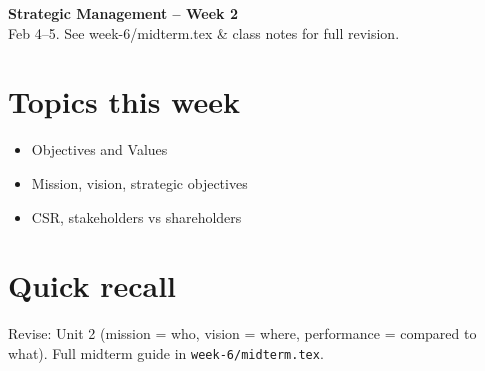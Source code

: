 \documentclass[10pt,a4paper]{article}
\begin{document}
\begin{center}
{\large\bfseries\color{eublue} Strategic Management -- Week 2}\\[0.2em]
\footnotesize Feb 4--5. See week-6/midterm.tex \& class notes for full revision.
\end{center}\vspace{0.5em}

\section*{\color{eublue}Topics this week}
\begin{itemize}
\item Objectives and Values
\item Mission, vision, strategic objectives
\item CSR, stakeholders vs shareholders
\end{itemize}

\section*{Quick recall}
Revise: Unit 2 (mission = who, vision = where, performance = compared to what). Full midterm guide in \texttt{week-6/midterm.tex}.
\end{document}

